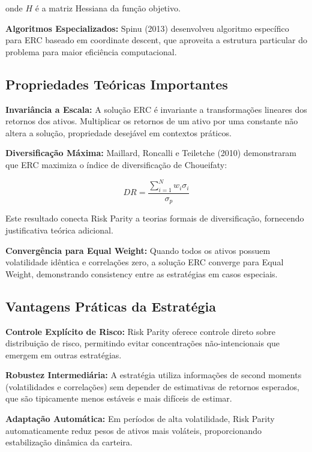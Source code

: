 onde $H$ é a matriz Hessiana da função objetivo.

\textbf{Algoritmos Especializados:} Spinu (2013) desenvolveu algoritmo específico para ERC baseado em coordinate descent, que aproveita a estrutura particular do problema para maior eficiência computacional.

\subsection{Propriedades Teóricas Importantes}

\textbf{Invariância a Escala:} A solução ERC é invariante a transformações lineares dos retornos dos ativos. Multiplicar os retornos de um ativo por uma constante não altera a solução, propriedade desejável em contextos práticos.

\textbf{Diversificação Máxima:} Maillard, Roncalli e Teiletche (2010) demonstraram que ERC maximiza o índice de diversificação de Choueifaty:

\begin{equation}
DR = \frac{\sum_{i=1}^{N} w_i \sigma_i}{\sigma_p}
\end{equation}

Este resultado conecta Risk Parity a teorias formais de diversificação, fornecendo justificativa teórica adicional.

\textbf{Convergência para Equal Weight:} Quando todos os ativos possuem volatilidade idêntica e correlações zero, a solução ERC converge para Equal Weight, demonstrando consistency entre as estratégias em casos especiais.

\subsection{Vantagens Práticas da Estratégia}

\textbf{Controle Explícito de Risco:} Risk Parity oferece controle direto sobre distribuição de risco, permitindo evitar concentrações não-intencionais que emergem em outras estratégias.

\textbf{Robustez Intermediária:} A estratégia utiliza informações de second moments (volatilidades e correlações) sem depender de estimativas de retornos esperados, que são tipicamente menos estáveis e mais difíceis de estimar.

\textbf{Adaptação Automática:} Em períodos de alta volatilidade, Risk Parity automaticamente reduz pesos de ativos mais voláteis, proporcionando estabilização dinâmica da carteira.

